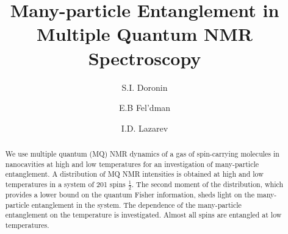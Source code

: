 \documentclass[%
 reprint,
superscriptaddress,
 amsmath,amssymb,
]{revtex4-2}
\begin{document}

\title{Many-particle Entanglement in Multiple Quantum NMR Spectroscopy} 

\author{S.I. Doronin}
\author{E.B Fel'dman}
\author{I.D. Lazarev}



\begin{abstract}
We use multiple quantum (MQ) NMR dynamics of a gas of spin-carrying molecules in nanocavities at high and low temperatures for an investigation of many-particle entanglement. 
A distribution of MQ NMR intensities is obtained at high and low temperatures in a system  of 201 spins $\frac 1 2$. 
The second moment of the distribution, which provides a lower bound on the quantum Fisher information, sheds light on the many-particle entanglement in the system. 
The dependence of the many-particle entanglement on the temperature is investigated.  
Almost all spins are entangled at low temperatures.

\end{abstract}

\maketitle

\end{document}

